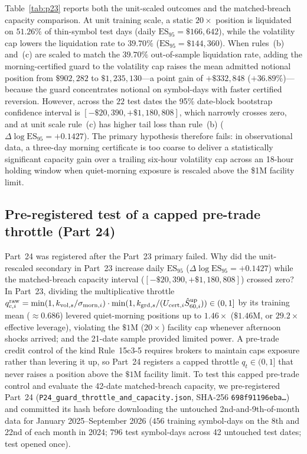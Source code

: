 Table~\ref{tab:p23} reports both the unit-scaled outcomes and the matched-breach capacity comparison. At unit training scale, a static $20\times$ position is liquidated on $51.26\%$ of thin-symbol test days (daily $\mathrm{ES}_{95}=\$166{,}642$), while the volatility cap lowers the liquidation rate to $39.70\%$ ($\mathrm{ES}_{95}=\$144{,}360$). When rules~(b) and~(c) are scaled to match the $39.70\%$ out-of-sample liquidation rate, adding the morning-certified guard to the volatility cap raises the mean admitted notional position from $\$902{,}282$ to $\$1{,}235{,}130$---a point gain of $+\$332{,}848$ ($+36.89\%$)---because the guard concentrates notional on symbol-days with faster certified reversion. However, across the $22$ test dates the 95\% date-block bootstrap confidence interval is $[-\$20{,}390,+\$1{,}180{,}808]$, which narrowly crosses zero, and at unit scale rule~(c) has higher tail loss than rule~(b) ($\Delta\log\mathrm{ES}_{95}=+0.1427$). The primary hypothesis therefore fails: in observational data, a three-day morning certificate is too coarse to deliver a statistically significant capacity gain over a trailing six-hour volatility cap across an 18-hour holding window when quiet-morning exposure is rescaled above the \$1M facility limit.

\subsection{Pre-registered test of a capped pre-trade throttle (Part 24)}\label{sec:p24}
Part~24 was registered after the Part~23 primary failed. Why did the unit-rescaled secondary in Part~23 increase daily $\mathrm{ES}_{95}$ ($\Delta\log\mathrm{ES}_{95}=+0.1427$) while the matched-breach capacity interval ($[-\$20{,}390,+\$1{,}180{,}808]$) crossed zero? In Part~23, dividing the multiplicative throttle $q^{\rm raw}_{c,i}=\min(1,k_{{\rm vol},s}/\sigma_{{\rm morn},i})\cdot\min(1,k_{{\rm grd},s}/(U_{{\rm cert},i}\hat S^{\rm up}_{60,i}))\in(0,1]$ by its training mean ($\approx0.686$) levered quiet-morning positions up to $1.46\times$ ($\$1.46\text{M}$, or $29.2\times$ effective leverage), violating the $\$1\text{M}$ ($20\times$) facility cap whenever afternoon shocks arrived; and the 21-date sample provided limited power. A pre-trade credit control of the kind Rule~15c3-5 requires brokers to maintain caps exposure rather than levering it up, so Part~24 registers a capped throttle $q_t\in(0,1]$ that never raises a position above the $\$1\text{M}$ facility limit. To test this capped pre-trade control and evaluate the 42-date matched-breach capacity, we pre-registered Part~24 (\texttt{P24\_guard\_throttle\_and\_capacity.json}, SHA-256 \texttt{698f91196eba\ldots}) and committed its hash before downloading the untouched 2nd-and-9th-of-month data for January 2025--September 2026 ($456$ training symbol-days on the 8th and 22nd of each month in 2024; $796$ test symbol-days across 42 untouched test dates; test opened once).


